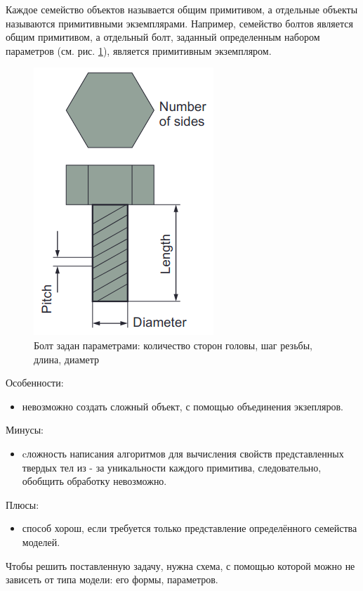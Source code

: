 \clearpage
Каждое семейство объектов называется общим примитивом, а отдельные объекты называются примитивными экземплярами.
Например, семейство болтов является общим примитивом, а отдельный болт, заданный определенным набором параметров (см. рис. \ref{fig:bolt}), является примитивным экземпляром.
\begin{figure}
  \centering
  \includegraphics[scale=0.6]{inc/img/bolt}
  \caption{Болт задан параметрами: количество сторон головы, шаг резьбы, длина, диаметр}
  \label{fig:bolt}
\end{figure}

Особенности: 
\begin{itemize}
\item невозможно создать сложный объект, с помощью объединения экзепляров.
\end{itemize}

Минусы:  
\begin{itemize} 
\item cложность написания алгоритмов для вычисления свойств представленных твердых тел из - за уникальности каждого примитива, 
следовательно, обобщить обработку невозможно.
\end{itemize}

Плюсы:
\begin{itemize}
  \item способ хорош, если требуется только представление определённого семейства моделей.
\end{itemize}

Чтобы решить поставленную задачу, нужна схема, с помощью которой можно не зависеть от типа модели: его формы, параметров.

